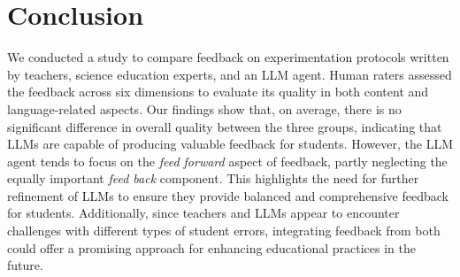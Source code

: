 \section{Conclusion}

We conducted a study to compare feedback on experimentation protocols written by teachers, science education experts, and an LLM agent. Human raters assessed the feedback across six dimensions to evaluate its quality in both content and language-related aspects. Our findings show that, on average, there is no significant difference in overall quality between the three groups, indicating that LLMs are capable of producing valuable feedback for students.
However, the LLM agent tends to focus on the \textit{feed forward} aspect of feedback, partly neglecting the equally important \textit{feed back} component. This highlights the need for further refinement of LLMs to ensure they provide balanced and comprehensive feedback for students. Additionally, since teachers and LLMs appear to encounter challenges with different types of student errors, integrating feedback from both could offer a promising approach for enhancing educational practices in the future.